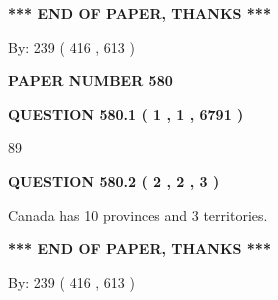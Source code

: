 \documentclass[12pt]{article}
\begin{document}
   
   
\vspace{1.0in} 
{\textbf{\large{ *** END OF PAPER, THANKS *** }}} 
   
   
\hspace{1.0in} By: 
 239 ( 416 ,  613 )
   
   
   
   
\newpage 
\setcounter{page}{ 
   580001 } 
   
   
   
   
 {\textbf{ \Large{ PAPER NUMBER  580  }}}
   
   
\vspace{0.2in}
   
   
   
   
   
   
 \vspace{0.2in}
 
 
 
 
   
   
  
\vspace{0.2in}
  
{\textbf{\Large{QUESTION
580.1 
 ( 1 , 1 , 6791 )
}}}
  
  
 
 
\noindent{}

89
 
 
  
\vspace{0.2in}
  
{\textbf{\Large{QUESTION
580.2 
 ( 2 , 2 , 3 )
}}}
  
  
 
 
\noindent{}
 
 
Canada has 10  provinces and 3 territories.
 
 
 
 
   
   
 \vspace{0.2in}
 
   
   
   
   
\vspace{1.0in} 
{\textbf{\large{ *** END OF PAPER, THANKS *** }}} 
   
   
\hspace{1.0in} By: 
 239 ( 416 ,  613 )
   
\end{document}
